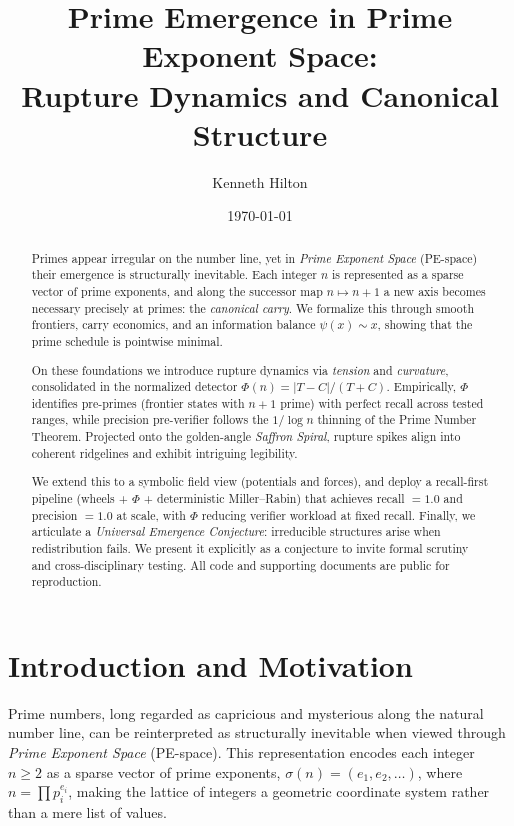 \documentclass[11pt]{article}
\title{\Large Prime Emergence in Prime Exponent Space:\\
\large Rupture Dynamics and Canonical Structure}
\author{Kenneth Hilton}
\date{\today}
\theoremstyle{plain}
\theoremstyle{definition}
\begin{document}
\maketitle

\begin{abstract}
Primes appear irregular on the number line, yet in \emph{Prime Exponent Space} (PE-space) their emergence is structurally inevitable. Each integer $n$ is represented as a sparse vector of prime exponents, and along the successor map $n \mapsto n+1$ a new axis becomes necessary precisely at primes: the \emph{canonical carry}. We formalize this through smooth frontiers, carry economics, and an information balance $\psi(x)\sim x$, showing that the prime schedule is pointwise minimal.

On these foundations we introduce rupture dynamics via \emph{tension} and \emph{curvature}, consolidated in the normalized detector $\Phi(n)=\lvert T-C\rvert/(T+C)$. Empirically, $\Phi$ identifies pre-primes (frontier states with $n+1$ prime) with perfect recall across tested ranges, while precision pre-verifier follows the $1/\log n$ thinning of the Prime Number Theorem. Projected onto the golden-angle \emph{Saffron Spiral}, rupture spikes align into coherent ridgelines and exhibit intriguing legibility.

We extend this to a symbolic field view (potentials and forces), and deploy a recall-first pipeline (wheels + $\Phi$ + deterministic Miller–Rabin) that achieves recall $=1.0$ and precision $=1.0$ at scale, with $\Phi$ reducing verifier workload at fixed recall. Finally, we articulate a \emph{Universal Emergence Conjecture}: irreducible structures arise when redistribution fails. We present it explicitly as a conjecture to invite formal scrutiny and cross-disciplinary testing. All code and supporting documents are public for reproduction.
\end{abstract}


\section{Introduction and Motivation}

Prime numbers, long regarded as capricious and mysterious along the natural number line, can be reinterpreted as structurally inevitable when viewed through \emph{Prime Exponent Space} (PE-space). This representation encodes each integer $n \geq 2$ as a sparse vector of prime exponents, $\sigma(n) = (e_1,e_2,\dots)$, where $n=\prod p_i^{e_i}$, making the lattice of integers a geometric coordinate system rather than a mere list of values.
\end{document}
